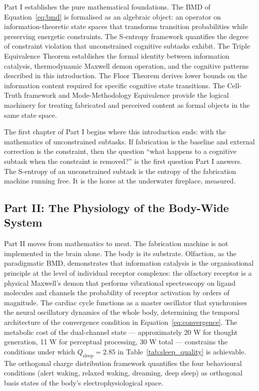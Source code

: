 Part I establishes the pure mathematical foundations. The BMD of Equation~\eqref{eq:bmd} is formalised as an algebraic object: an operator on information-theoretic state spaces that transforms transition probabilities while preserving energetic constraints. The S-entropy framework quantifies the degree of constraint violation that unconstrained cognitive subtasks exhibit. The Triple Equivalence Theorem establishes the formal identity between information catalysis, thermodynamic Maxwell demon operation, and the cognitive patterns described in this introduction. The Floor Theorem derives lower bounds on the information content required for specific cognitive state transitions. The Cell-Truth framework and Mode-Methodology Equivalence provide the logical machinery for treating fabricated and perceived content as formal objects in the same state space.

The first chapter of Part I begins where this introduction ends: with the mathematics of unconstrained subtasks. If fabrication is the baseline and external correction is the constraint, then the question ``what happens to a cognitive subtask when the constraint is removed?'' is the first question Part I answers. The S-entropy of an unconstrained subtask is the entropy of the fabrication machine running free. It is the horse at the underwater fireplace, measured.

\subsection{Part II: The Physiology of the Body-Wide System}

Part II moves from mathematics to meat. The fabrication machine is not implemented in the brain alone. The body is its substrate. Olfaction, as the paradigmatic BMD, demonstrates that information catalysis is the organisational principle at the level of individual receptor complexes: the olfactory receptor is a physical Maxwell's demon that performs vibrational spectroscopy on ligand molecules and channels the probability of receptor activation by orders of magnitude. The cardiac cycle functions as a master oscillator that synchronises the neural oscillatory dynamics of the whole body, determining the temporal architecture of the convergence condition in Equation~\eqref{eq:convergence}. The metabolic cost of the dual-channel state --- approximately 20 W for thought generation, 11 W for perceptual processing, 30 W total --- constrains the conditions under which $Q_{\mathrm{sleep}} = 2.85$ in Table~\ref{tab:sleep_quality} is achievable. The orthogonal charge distribution framework quantifies the four behavioural conditions (alert waking, relaxed waking, dreaming, deep sleep) as orthogonal basis states of the body's electrophysiological space.


